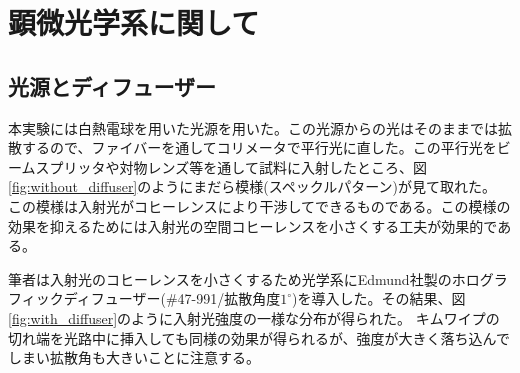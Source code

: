 \section{顕微光学系に関して}
\subsection{光源とディフューザー}
本実験には白熱電球を用いた光源を用いた。この光源からの光はそのままでは拡散するので、ファイバーを通してコリメータで平行光に直した。この平行光をビームスプリッタや対物レンズ等を通して試料に入射したところ、図\ref{fig:without_diffuser}のようにまだら模様(スペックルパターン)が見て取れた。
この模様は入射光がコヒーレンスにより干渉してできるものである。この模様の効果を抑えるためには入射光の空間コヒーレンスを小さくする工夫が効果的である。

筆者は入射光のコヒーレンスを小さくするため光学系にEdmund社製のホログラフィックディフューザー(\#47-991/拡散角度$1^\circ$)を導入した。その結果、図\ref{fig:with_diffuser}のように入射光強度の一様な分布が得られた。
キムワイプの切れ端を光路中に挿入しても同様の効果が得られるが、強度が大きく落ち込んでしまい拡散角も大きいことに注意する。
